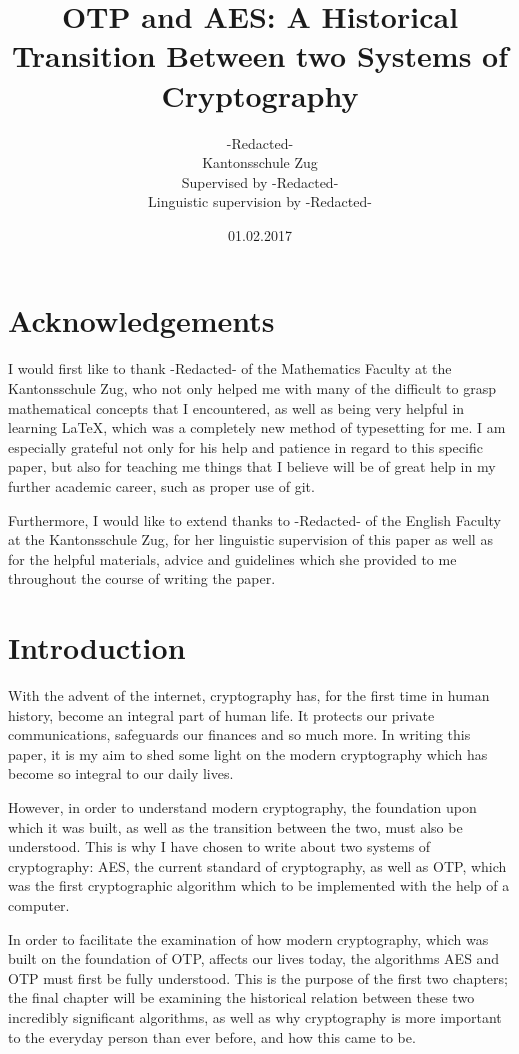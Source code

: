 \documentclass[12pt, a4paper]{report}
\theoremstyle{definition}
\theoremstyle{remark}
\begin{document}
\title{OTP and AES: A Historical Transition Between two Systems of Cryptography}
\author{-Redacted-\\Kantonsschule Zug\\Supervised by -Redacted-\\Linguistic supervision by -Redacted-}
\date{01.02.2017}
\maketitle

\chapter*{Acknowledgements}
I would first like to thank -Redacted- of the Mathematics Faculty at the Kantonsschule Zug, who not only helped me with many of the difficult to grasp mathematical concepts that I encountered, as well as being very helpful in learning \LaTeX, which was a completely new method of typesetting for me. I am especially grateful not only for his help and patience in regard to this specific paper, but also for teaching me things that I believe will be of great help in my further academic career, such as proper use of git.

Furthermore, I would like to extend thanks to -Redacted- of the English Faculty at the Kantonsschule Zug, for her linguistic supervision of this paper as well as for the helpful materials, advice and guidelines which she provided to me throughout the course of writing the paper.

\chapter*{Introduction}
With the advent of the internet, cryptography has, for the first time in human history, become an integral part of human life. It protects our private communications, safeguards our finances and so much more. In writing this paper, it is my aim to shed some light on the modern cryptography which has become so integral to our daily lives.

However, in order to understand modern cryptography, the foundation upon which it was built, as well as the transition between the two, must also be understood. This is why I have chosen to write about two systems of cryptography: AES, the current standard of cryptography, as well as OTP, which was the first cryptographic algorithm which to be implemented with the help of a computer.

In order to facilitate the examination of how modern cryptography, which was built on the foundation of OTP, affects our lives today, the algorithms AES and OTP must first be fully understood. This is the purpose of the first two chapters; the final chapter will be examining the historical relation between these two incredibly significant algorithms, as well as why cryptography is more important to the everyday person than ever before, and how this came to be.
\end{document}
